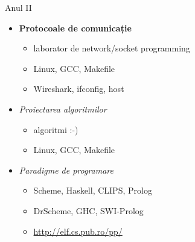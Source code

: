\documentclass{simple}
\begin{document}

\begin{frame}{Anul II}
	\begin{itemize}
		\item \textbf{Protocoale de comunicație}
			\begin{itemize}
				\item laborator de network/socket programming
				\item Linux, GCC, Makefile
				\item Wireshark, ifconfig, host
			\end{itemize}
		\item \textit{Proiectarea algoritmilor}
			\begin{itemize}
				\item algoritmi :-)
				\item Linux, GCC, Makefile
			\end{itemize}
		\item \textit{Paradigme de programare}
			\begin{itemize}
				\item Scheme, Haskell, CLIPS, Prolog
				\item DrScheme, GHC, SWI-Prolog
				\item \url{http://elf.cs.pub.ro/pp/}
			\end{itemize}
	\end{itemize}
\end{frame}

\end{document}
